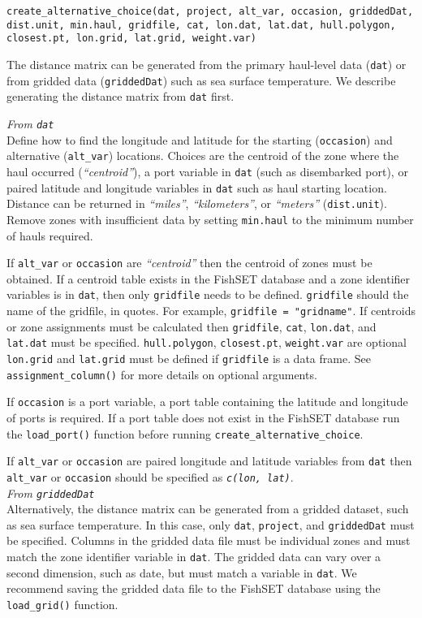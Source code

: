 \documentclass[
]{article}
\begin{document}
\begin{verbatim}
create_alternative_choice(dat, project, alt_var, occasion, griddedDat, dist.unit, min.haul, gridfile, cat, lon.dat, lat.dat, hull.polygon, closest.pt, lon.grid, lat.grid, weight.var)
\end{verbatim}

The distance matrix can be generated from the primary haul-level data (\texttt{dat}) or from gridded data (\texttt{griddedDat}) such as sea surface temperature. We describe generating the distance matrix from \texttt{dat} first.

\emph{From \texttt{dat}}\\
Define how to find the longitude and latitude for the starting (\texttt{occasion}) and alternative (\texttt{alt\_var}) locations. Choices are the centroid of the zone where the haul occurred (\emph{``centroid''}), a port variable in \texttt{dat} (such as disembarked port), or paired latitude and longitude variables in \texttt{dat} such as haul starting location. Distance can be returned in \emph{``miles''}, \emph{``kilometers''}, or \emph{``meters''} (\texttt{dist.unit}). Remove zones with insufficient data by setting \texttt{min.haul} to the minimum number of hauls required.

If \texttt{alt\_var} or \texttt{occasion} are \emph{``centroid''} then the centroid of zones must be obtained. If a centroid table exists in the FishSET database and a zone identifier variables is in \texttt{dat}, then only \texttt{gridfile} needs to be defined. \texttt{gridfile} should the name of the gridfile, in quotes. For example, \texttt{gridfile\ =\ "gridname"}. If centroids or zone assignments must be calculated then \texttt{gridfile}, \texttt{cat}, \texttt{lon.dat}, and \texttt{lat.dat} must be specified. \texttt{hull.polygon}, \texttt{closest.pt}, \texttt{weight.var} are optional \texttt{lon.grid} and \texttt{lat.grid} must be defined if \texttt{gridfile} is a data frame. See \texttt{assignment\_column()} for more details on optional arguments.

If \texttt{occasion} is a port variable, a port table containing the latitude and longitude of ports is required. If a port table does not exist in the FishSET database run the \texttt{load\_port()} function before running \texttt{create\_alternative\_choice}.

If \texttt{alt\_var} or \texttt{occasion} are paired longitude and latitude variables from \texttt{dat} then \texttt{alt\_var} or \texttt{occasion} should be specified as \emph{\texttt{c(lon,\ lat)}}.\\
\emph{From \texttt{griddedDat}}\\
Alternatively, the distance matrix can be generated from a gridded dataset, such as sea surface temperature. In this case, only \texttt{dat}, \texttt{project}, and \texttt{griddedDat} must be specified. Columns in the gridded data file must be individual zones and must match the zone identifier variable in \texttt{dat}. The gridded data can vary over a second dimension, such as date, but must match a variable in \texttt{dat}. We recommend saving the gridded data file to the FishSET database using the \texttt{load\_grid()} function.
\end{document}
